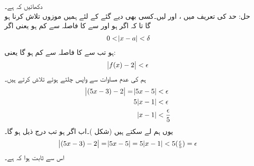 دکھائیں کہ  ہے۔\\
حل:\quad
حد کی تعریف میں ،  اور  لیں۔کسی بھی دیے گئے   کے لئے ہمیں موزوں  تلاش کرنا ہو گا تا کہ اگر  ہو اور  سے  کا فاصلہ  سے کم ہو یعنی اگر
\begin{align*}
0<\abs{x-a}<\delta
\end{align*}
ہو تب  سے  کا فاصلہ  سے کم ہو گا یعنی:
\begin{align*}
\abs{f(x)-2}<\epsilon
\end{align*}
ہم  کی عدم مساوات سے واپس چلتے ہوئے  تلاش کرتے ہیں۔
\begin{align*}
\abs{(5x-3)-2}=\abs{5x-5}&<\epsilon\\
5\abs{x-1}&<\epsilon\\
\abs{x-1}&<\frac{\epsilon}{5}
\end{align*}
یوں ہم  لے سکتے ہیں (شکل )۔اب اگر  ہو تب درج ذیل ہو گا۔
\begin{align*}
\abs{(5x-3)-2}=\abs{5x-5}=5\abs{x-1}<5(\tfrac{\epsilon}{5})=\epsilon
\end{align*}
اس سے ثابت ہوا کہ  ہے۔

